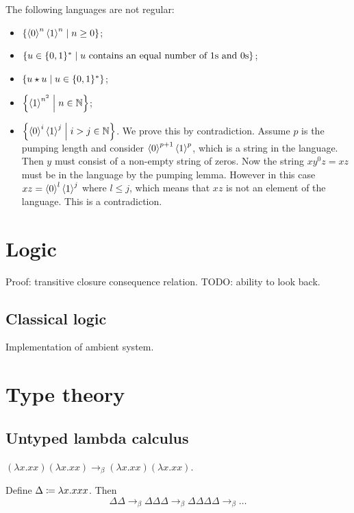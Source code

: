 \begin{example}
The following languages are not regular:
\begin{itemize}
\item $\setbuilder{\seq{0}^n\seq{1}^n}{n\geq 0}$;
\item $\setbuilder{u\in \{0, 1\}^*}{\text{$u$ contains an equal number of $1$s and $0$s}}$;
\item $\setbuilder{u\concat u}{u\in \{0,1\}^*}$;
\item $\setbuilder{\seq{1}^{n^2}}{n\in \N}$;
\item $\setbuilder{\seq{0}^i\seq{1}^j}{i>j \in \N}$. We prove this by contradiction. Assume $p$ is the pumping length and consider $\left\langle 0 \right\rangle^{p+1}\left\langle 1 \right\rangle^p$, which is a string in the language. Then $y$ must consist of a non-empty string of zeros. Now the string $xy^0z = xz$ must be in the language by the pumping lemma. However in this case $xz = \left\langle 0 \right\rangle^l\left\langle 1 \right\rangle^j$ where $l\leq j$, which means that $xz$ is not an element of the language. This is a contradiction.
\end{itemize}
\end{example}

\chapter{Logic}
Proof: transitive closure consequence relation. TODO: ability to look back.

\section{Classical logic}
Implementation of ambient system.

\chapter{Type theory}
\section{Untyped lambda calculus}

\begin{example}
$(\lambda x. x x)(\lambda x. x x) \to_\beta (\lambda x. x x)(\lambda x. x x)$.

Define $\Delta \coloneqq \lambda x. xxx$. Then
\[ \Delta\Delta \to_\beta \Delta\Delta\Delta \to_\beta \Delta\Delta\Delta\Delta \to_\beta \ldots \]
\end{example}

